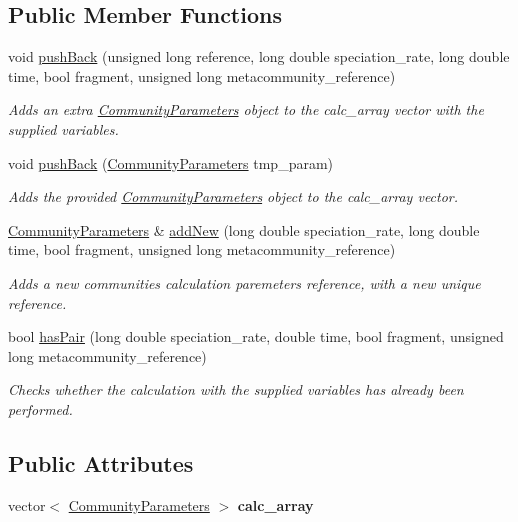 \subsection*{Public Member Functions}
\begin{DoxyCompactItemize}
\item 
void \hyperlink{struct_communities_array_ab216cad89ebc4cf73859093060a4a20c}{push\+Back} (unsigned long reference, long double speciation\+\_\+rate, long double time, bool fragment, unsigned long metacommunity\+\_\+reference)
\begin{DoxyCompactList}\small\item\em Adds an extra \hyperlink{struct_community_parameters}{Community\+Parameters} object to the calc\+\_\+array vector with the supplied variables. \end{DoxyCompactList}\item 
void \hyperlink{struct_communities_array_a0abeec9457993dffd047a78db4e4b289}{push\+Back} (\hyperlink{struct_community_parameters}{Community\+Parameters} tmp\+\_\+param)
\begin{DoxyCompactList}\small\item\em Adds the provided \hyperlink{struct_community_parameters}{Community\+Parameters} object to the calc\+\_\+array vector. \end{DoxyCompactList}\item 
\hyperlink{struct_community_parameters}{Community\+Parameters} \& \hyperlink{struct_communities_array_adf488e4c1790eb8d850820d8014d89fa}{add\+New} (long double speciation\+\_\+rate, long double time, bool fragment, unsigned long metacommunity\+\_\+reference)
\begin{DoxyCompactList}\small\item\em Adds a new communities calculation paremeters reference, with a new unique reference. \end{DoxyCompactList}\item 
bool \hyperlink{struct_communities_array_a53d5250849767365e4d50751c3583309}{has\+Pair} (long double speciation\+\_\+rate, double time, bool fragment, unsigned long metacommunity\+\_\+reference)
\begin{DoxyCompactList}\small\item\em Checks whether the calculation with the supplied variables has already been performed. \end{DoxyCompactList}\end{DoxyCompactItemize}
\subsection*{Public Attributes}
\begin{DoxyCompactItemize}
\item 
vector$<$ \hyperlink{struct_community_parameters}{Community\+Parameters} $>$ {\bfseries calc\+\_\+array}\hypertarget{struct_communities_array_addd27a8197dd835e55c529294ecae398}{}\label{struct_communities_array_addd27a8197dd835e55c529294ecae398}

\end{DoxyCompactItemize}


